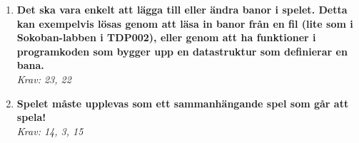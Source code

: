 \documentclass[12pt]{TDP005mall}
\begin{document}
\begin{enumerate}
    
    \item \textbf{Det ska vara enkelt att lägga till eller ändra banor i spelet. Detta kan exempelvis lösas genom att läsa in banor från en fil (lite som i Sokoban-labben i TDP002), eller genom att ha funktioner i programkoden som bygger upp en datastruktur som definierar en bana.} \\ \emph{Krav: 23, 22}
    
    \item \textbf{Spelet måste upplevas som ett sammanhängande spel som går att spela!} \\ \emph{Krav: 14, 3, 15}
\end{enumerate}
\end{document}
